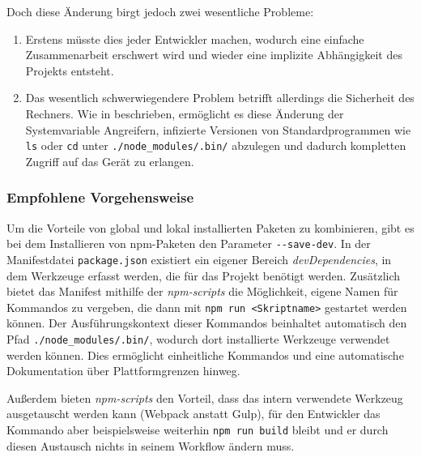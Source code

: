 \begin{enumerate}
    Doch diese Änderung birgt jedoch zwei wesentliche Probleme:
    \begin{enumerate}
        \item Erstens müsste dies jeder Entwickler machen, wodurch eine einfache Zusammenarbeit erschwert wird und wieder eine implizite Abhängigkeit des Projekts entsteht.
        \item Das wesentlich schwerwiegendere Problem betrifft allerdings die Sicherheit des Rechners.
        Wie in \autocite{stackoverflow:nodemodules-hack:online} beschrieben, ermöglicht es diese Änderung der Systemvariable Angreifern, infizierte Versionen von Standardprogrammen wie \verb|ls| oder \verb|cd| unter \verb|./node_modules/.bin/| abzulegen und dadurch kompletten Zugriff auf das Gerät zu erlangen.
    \end{enumerate}
\end{enumerate}



\subsubsection{Empfohlene Vorgehensweise}
\label{subsub:packages-best-practice}
Um die Vorteile von global und lokal installierten Paketen zu kombinieren, gibt es bei dem Installieren von npm-Paketen den Parameter \verb|--save-dev|.
In der Manifestdatei \verb|package.json| existiert ein eigener Bereich \emph{devDependencies}, in dem Werkzeuge erfasst werden, die für das Projekt benötigt werden.
Zusätzlich bietet das Manifest mithilfe der \emph{npm-scripts} die Möglichkeit, eigene Namen für Kommandos zu vergeben, die dann mit \verb|npm run <Skriptname>| gestartet werden können.
Der Ausführungskontext dieser Kommandos beinhaltet automatisch den Pfad \verb|./node_modules/.bin/|, wodurch dort installierte Werkzeuge verwendet werden können.
Dies ermöglicht einheitliche Kommandos und eine automatische Dokumentation über Plattformgrenzen hinweg.

Außerdem bieten \emph{npm-scripts} den Vorteil, dass das intern verwendete Werkzeug ausgetauscht werden kann (\zB Webpack anstatt Gulp), für den Entwickler das Kommando aber beispielsweise weiterhin \verb|npm run build| bleibt und er durch diesen Austausch nichts in seinem Workflow ändern muss.
